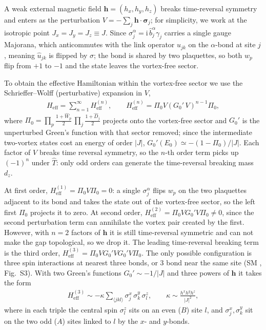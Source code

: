 \documentclass[
  aps,
  prl,
  reprint,
  amsmath,
  amssymb,
  superscriptaddress,
  floatfix
]{revtex4-2}
\newcommand{\ii}{\mathrm{i}}
\renewcommand{\abs}[1]{\left| #1 \right|}
\begin{document}
A weak external magnetic field $\bm h = (h_x, h_y, h_z)$ breaks time-reversal
symmetry and enters as the perturbation $V = -\sum_j \bm h \cdot
\bm\sigma_j$; for simplicity, we work at the isotropic point $J_x = J_y = J_z \equiv J$.
Since $\sigma_j^\alpha = \ii\, \hat b_j^\alpha \gamma_j$ carries a single
gauge Majorana, which anticommutes with the link operator $\hat u_{jk}$ on
the $\alpha$-bond at site $j$, meaning $\hat u_{jk}$ is flipped by $\sigma$;
the bond is shared by two plaquettes, so both $w_p$ flip from $+1$ to $-1$
and the state leaves the vortex-free sector.

To obtain the effective Hamiltonian within the vortex-free sector we use the 
Schrieffer--Wolff (perturbative) expansion in $V$,
\begin{align}
  H_{\text{eff}} = \sum_{n=1}^{\infty} H^{(n)}_{\text{eff}},
  \qquad
  H^{(n)}_{\text{eff}} = \Pi_0 V \left( G_0'\, V \right)^{n-1} \Pi_0 ,
\end{align}
where $\Pi_0=\prod_p \tfrac{1+\hat W_p}{2}\,\prod_j \tfrac{1+\hat D_j}{2}$
projects onto the vortex-free sector and $G_0'$ is the unperturbed Green's
function with that sector removed; since the intermediate two-vortex states
cost an energy of order $\abs{J}$, $G_0'(E_0) \simeq -(1-\Pi_0)/\abs{J}$.
Each factor of $V$ breaks time reversal symmetry, so the
$n$-th order term picks up $(-1)^n$ under $\hat T$: only odd orders can
generate the time-reversal breaking mass $d_z$.

At first order, $H^{(1)}_{\text{eff}} = \Pi_0 V \Pi_0 = 0$: a single
$\sigma_j^\alpha$ flips $w_p$ on the two plaquettes adjacent to its bond and
takes the state out of the vortex-free sector, so the left first $\Pi_0$ projects
it to zero. At second order, $H^{(2)}_{\text{eff}}=\Pi_0 V G_0' V
\Pi_0\neq0$, since the second perturbation term can annihilate the vortex pair
created by the first. However, with $n=2$ factors of $\bm h$ it is still
time-reversal symmetric and can not make the gap topological, so we drop it. The leading time-reversal breaking
term is the third order, $H^{(3)}_{\text{eff}}=\Pi_0 V G_0' V G_0' V
\Pi_0$. The only possible configuration is three spin interactions at nearest three bonds, or 3 bond near the same site (SM \cite{SM}, Fig.~S3). With two Green's functions $G_0'\sim
-1/\abs{J}$ and three powers of $\bm h$ it takes the form
\begin{align}
  H^{(3)}_{\text{eff}} \sim -\kappa \sum_{\langle jkl\rangle}
  \sigma_j^x\, \sigma_k^y\, \sigma_l^z,
  \qquad
  \kappa \sim \frac{h^x h^y h^z}{\abs{J}^2},
  \label{eq:H3_spin}
\end{align}
where in each triple the central spin $\sigma_l^z$ sits on an even ($B$) site
$l$, and $\sigma_j^x, \sigma_k^y$ sit on the two odd ($A$) sites linked to $l$
by the $x$- and $y$-bonds.
\end{document}
